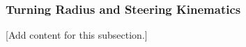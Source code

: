 
\subsubsection{Turning Radius and Steering Kinematics}
\label{subsubsec:design_3_3_turning_radius_steering_kinematics}

[Add content for this subsection.]
